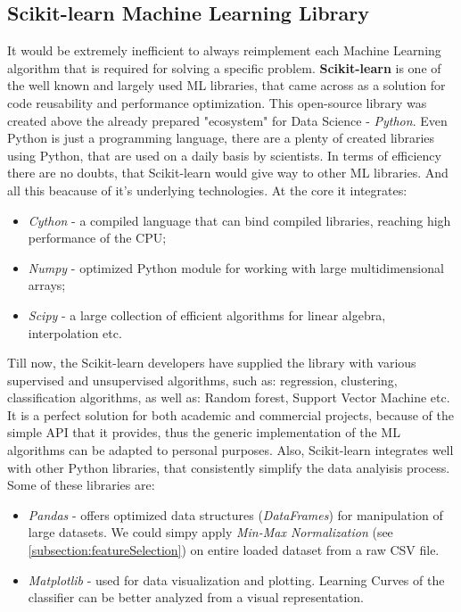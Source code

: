 \subsection{Scikit-learn Machine Learning Library}
It would be extremely inefficient to always reimplement each Machine Learning algorithm that is required for solving a specific problem. \textbf{Scikit-learn} is one of the well known and largely used ML libraries, that came across as a solution for code reusability and performance optimization. This open-source library was created above the already prepared "ecosystem" for Data Science - \textit{Python}. Even Python is just a programming language, there are a plenty of created libraries using Python, that are used on a daily basis by scientists. In terms of efficiency there are no doubts, that Scikit-learn would give way to other ML libraries. And all this beacause of it's underlying technologies. At the core it integrates:

\begin{itemize}
	\item \textit{Cython} - a compiled language that can bind compiled libraries, reaching high performance of the CPU;
	\item \textit{Numpy} - optimized Python module for working with large multidimensional arrays;
	\item \textit{Scipy} - a large collection of efficient algorithms for linear algebra, interpolation etc.
\end{itemize}

Till now, the Scikit-learn developers have supplied the library with various supervised and unsupervised algorithms, such as: regression, clustering, classification algorithms, as well as: Random forest, Support Vector Machine etc. It is a perfect solution for both academic and commercial projects, because of the simple API that it provides, thus the generic implementation of the ML algorithms can be adapted to personal purposes. Also, Scikit-learn integrates well with other Python libraries, that consistently simplify the data analyisis process. Some of these libraries are: 

\begin{itemize}
	\item \textit{Pandas} - offers optimized data structures (\textit{DataFrames}) for manipulation of large datasets. We could simpy apply \textit{Min-Max Normalization} (see \ref{subsection:featureSelection}) on entire loaded dataset from a raw CSV file.
	\item \textit{Matplotlib} - used for data visualization and plotting. Learning Curves of the classifier can be better analyzed from a visual representation.
\end{itemize}


